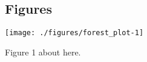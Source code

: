 \documentclass[sn-nature,referee,pdflatex]{sn-jnl}
\begin{document}
\subsection{Figures}\label{figures}

\texttt{[image: ./figures/forest\_plot-1]}

Figure 1 about here.

\newpage

\renewcommand\refname{References}

\end{document}
